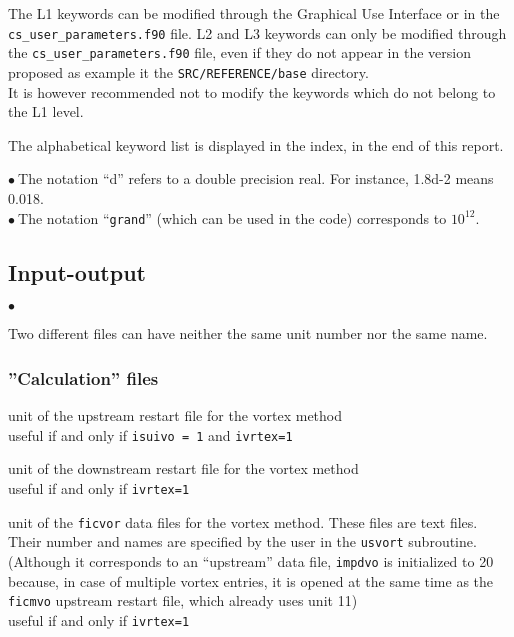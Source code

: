The L1 keywords can be modified through the Graphical Use Interface or
in the \texttt{cs\_user\_parameters.f90} file. L2 and L3 keywords can only be modified through
the \texttt{cs\_user\_parameters.f90} file, even if they do not appear in the version proposed
as example it the \texttt{SRC/REFERENCE/base} directory.\\
It is however recommended not to modify the keywords which do not belong to the L1
level.

The alphabetical keyword list is displayed in the index, in the end of
this report.

$\bullet\ $The notation ``d'' refers to a double precision real. For
           instance, 1.8d-2 means 0.018. \\
$\bullet\ $The notation ``{\tt grand}'' (which can be used in the code)
corresponds to $10^{12}$.

\subsection{Input-output}

\begin{list}{$\bullet$}{}
\item Two different files can have neither the same unit number nor the
      same name.
\end{list}

\subsubsection{''Calculation'' files}




{unit of the upstream restart file for the vortex method\\
useful if and only if {\tt isuivo = 1} and {\tt ivrtex=1}}

{unit of the downstream restart file for the vortex method\\
useful if and only if {\tt ivrtex=1}}

{unit of the {\tt ficvor} data files for the vortex method. These
files are text files. Their number and names are specified by the user in
the \texttt{usvort} subroutine.\\
(Although it corresponds to an ``upstream'' data file, {\tt impdvo} is
initialized to 20 because, in case of multiple vortex entries,
it is opened at the same time as the {\tt ficmvo} upstream restart file,
which already uses unit 11)\\
useful if and only if {\tt ivrtex=1}}


